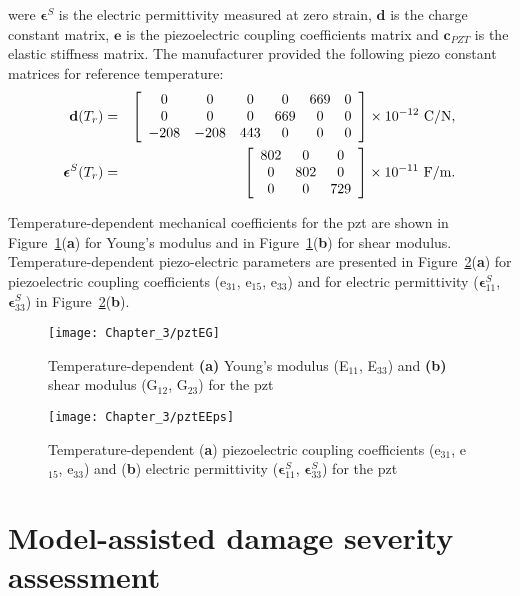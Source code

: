 \documentclass[11pt,a4paper,final]{report}
\theoremstyle{plain}
\begin{document}
were \(\boldsymbol{\epsilon}^S\) is the electric permittivity measured at zero strain, \(\boldsymbol{d}\) is the charge constant matrix, \(\boldsymbol{e}\) is the piezoelectric coupling coefficients matrix and \(\boldsymbol{c}_{PZT}\) is the elastic stiffness matrix. 
The manufacturer provided the following piezo constant matrices for reference temperature:
\begin{eqnarray}
	\textbf{d}(T_r) & = & \left[
	\begin{array}{cccccc}
	0 & 0 & 0 & 0 & 669 & 0\\
	0 & 0 & 0 & 669 & 0 & 0\\
	-208 & -208 & 443 & 0 & 0 & 0
	\end{array}\right] \times10^{-12}\ \unit[per-mode = symbol]{\coulomb\per\newton},\\
	\boldsymbol{\epsilon}^S(T_r) & = & \left[
	\begin{array}{ccc}
	802 & 0 & 0\\
	0 & 802 & 0\\
	0 & 0 & 729
\end{array}\right] \times10^{-11}\ \unit[per-mode = symbol]{\farad\per\meter}.
\end{eqnarray}

Temperature-dependent mechanical coefficients for the \ac{pzt} are shown in Figure~\ref{fig:pztEG}(\textbf{a}) for Young's modulus and in Figure~\ref{fig:pztEG}(\textbf{b}) for shear modulus.
Temperature-dependent piezo-electric parameters are presented in Figure~\ref{fig:pztEEps}(\textbf{a}) for piezoelectric coupling coefficients (e\(_{31}\), e\(_{15}\), e\(_{33}\)) and for electric permittivity (\(\boldsymbol{\epsilon}^S_{11}\), \(\boldsymbol{\epsilon}^S_{33}\)) in Figure~\ref{fig:pztEEps}(\textbf{b}).

\begin{figure}
	\begin{center}
		\texttt{[image: Chapter\_3/pztEG]}
	\end{center}
	\caption{Temperature-dependent \textbf{(a)} Young's modulus (E\(_{11}\), E\(_{33}\)) and \textbf{(b)} shear modulus (G\(_{12}\), G\(_{23}\)) for the \acs{pzt}}
	\label{fig:pztEG}
\end{figure}
\begin{figure}
	\begin{center}
		\texttt{[image: Chapter\_3/pztEEps]}
	\end{center}
	\caption{Temperature-dependent (\textbf{a}) piezoelectric coupling coefficients (e\(_{31}\), e\(_{15}\), e\(_{33}\)) and (\textbf{b}) electric permittivity (\(\boldsymbol{\epsilon}^S_{11}\), \(\boldsymbol{\epsilon}^S_{33}\)) for the \acs{pzt}}
	\label{fig:pztEEps}
\end{figure}
 \section{Model-assisted damage severity assessment}
\label{sec:madif}
\end{document}
